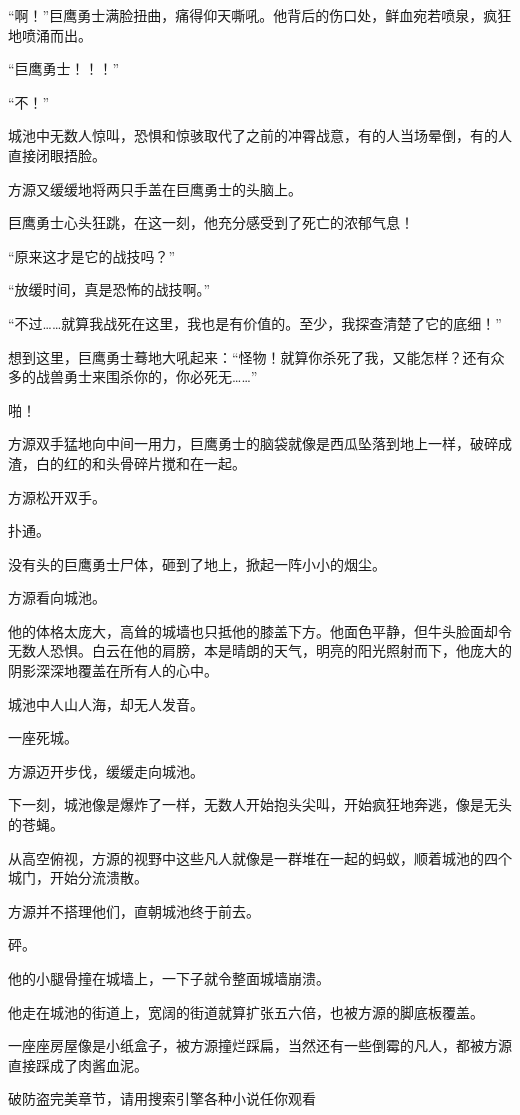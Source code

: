 \begin{this_body}
“啊！”巨鹰勇士满脸扭曲，痛得仰天嘶吼。他背后的伤口处，鲜血宛若喷泉，疯狂地喷涌而出。

“巨鹰勇士！！！”

“不！”

城池中无数人惊叫，恐惧和惊骇取代了之前的冲霄战意，有的人当场晕倒，有的人直接闭眼捂脸。

方源又缓缓地将两只手盖在巨鹰勇士的头脑上。

巨鹰勇士心头狂跳，在这一刻，他充分感受到了死亡的浓郁气息！

“原来这才是它的战技吗？”

“放缓时间，真是恐怖的战技啊。”

“不过……就算我战死在这里，我也是有价值的。至少，我探查清楚了它的底细！”

想到这里，巨鹰勇士蓦地大吼起来：“怪物！就算你杀死了我，又能怎样？还有众多的战兽勇士来围杀你的，你必死无……”

啪！

方源双手猛地向中间一用力，巨鹰勇士的脑袋就像是西瓜坠落到地上一样，破碎成渣，白的红的和头骨碎片搅和在一起。

方源松开双手。

扑通。

没有头的巨鹰勇士尸体，砸到了地上，掀起一阵小小的烟尘。

方源看向城池。

他的体格太庞大，高耸的城墙也只抵他的膝盖下方。他面色平静，但牛头脸面却令无数人恐惧。白云在他的肩膀，本是晴朗的天气，明亮的阳光照射而下，他庞大的阴影深深地覆盖在所有人的心中。

城池中人山人海，却无人发音。

一座死城。

方源迈开步伐，缓缓走向城池。

下一刻，城池像是爆炸了一样，无数人开始抱头尖叫，开始疯狂地奔逃，像是无头的苍蝇。

从高空俯视，方源的视野中这些凡人就像是一群堆在一起的蚂蚁，顺着城池的四个城门，开始分流溃散。

方源并不搭理他们，直朝城池终于前去。

砰。

他的小腿骨撞在城墙上，一下子就令整面城墙崩溃。

他走在城池的街道上，宽阔的街道就算扩张五六倍，也被方源的脚底板覆盖。

一座座房屋像是小纸盒子，被方源撞烂踩扁，当然还有一些倒霉的凡人，都被方源直接踩成了肉酱血泥。

破防盗完美章节，请用搜索引擎各种小说任你观看

\end{this_body}

